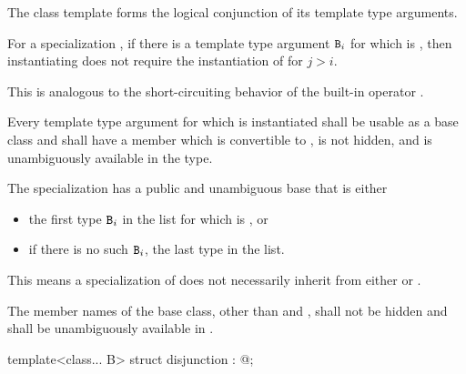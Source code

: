 \begin{itemdescr}
\pnum
The class template 
forms the logical conjunction of its template type arguments.

\pnum
For a specialization ,
if there is a template type argument $\texttt{\protect B}_{i}$
for which  is ,
then instantiating 
does not require the instantiation of  for $j > i$.
\begin{note}
This is analogous to the short-circuiting behavior of
the built-in operator \tcode{\&\&}.
\end{note}

\pnum
Every template type argument
for which  is instantiated
shall be usable as a base class and
shall have a member  which
is convertible to ,
is not hidden, and
is unambiguously available in the type.

\pnum
The specialization 
has a public and unambiguous base that is either
\begin{itemize}
\item
the first type $\texttt{\protect B}_{i}$ in the list 
for which  is , or
\item
if there is no such $\texttt{\protect B}_{i}$, the last type in the list.
\end{itemize}
\begin{note}
This means a specialization of 
does not necessarily inherit from
either  or .
\end{note}

\pnum
The member names of the base class, other than  and
, shall not be hidden and shall be unambiguously available
in .
\end{itemdescr}

%
\begin{itemdecl}
template<class... B> struct disjunction : @\seebelow@ { };
\end{itemdecl}

